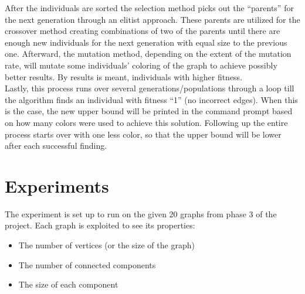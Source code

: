 \documentclass[a4paper]{report}
\begin{document}
		After the individuals are sorted the selection method picks out the “parents” for the next generation through an elitist approach. These parents are utilized for the crossover method creating combinations of two of the parents until there are enough new individuals for the next generation with equal size to the previous one. Afterward, the mutation method, depending on the extent of the mutation rate, will mutate some individuals’ coloring of the graph to achieve possibly better results. By results is meant, individuals with higher fitness.
\\
		
		Lastly, this process runs over several generations/populations through a loop till the algorithm finds an individual with fitness “1” (no incorrect edges). When this is the case, the new upper bound will be printed in the command prompt based on how many colors were used to achieve this solution. Following up the entire process starts over with one less color, so that the upper bound will be lower after each successful finding.
		
		
		
	\chapter{Experiments}
	The experiment is set up to run on the given 20 graphs from phase 3 of the project. Each graph is exploited to see its properties:
	\begin{itemize}
		\item The number of vertices (or the size of the graph)
		\item The number of connected components
		\item The size of each component
	\end{itemize}
\end{document}
